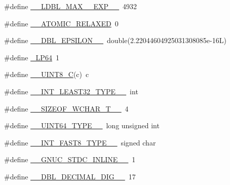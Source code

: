 \begin{DoxyCompactItemize}
\item 
\#define \hyperlink{build-analizer__host-_desktop___qt__5__9__0___g_c_c__64bit-debug_2moc__predefs_8h_afc6ac46966747a9423f4a6bb3af94b55}{\+\_\+\+\_\+\+L\+D\+B\+L\+\_\+\+M\+A\+X\+\_\+\_\+\+E\+X\+P\+\_\+\+\_\+}~4932
\item 
\#define \hyperlink{build-analizer__host-_desktop___qt__5__9__0___g_c_c__64bit-debug_2moc__predefs_8h_a8faf1f097f05558889df4c44d052d35e}{\+\_\+\+\_\+\+A\+T\+O\+M\+I\+C\+\_\+\+R\+E\+L\+A\+X\+E\+D}~0
\item 
\#define \hyperlink{build-analizer__host-_desktop___qt__5__9__0___g_c_c__64bit-debug_2moc__predefs_8h_a54983bc256dc296a42fe88b9be24f268}{\+\_\+\+\_\+\+D\+B\+L\+\_\+\+E\+P\+S\+I\+L\+O\+N\+\_\+\+\_\+}~double(2.\+22044604925031308085e-\/16\+L)
\item 
\#define \hyperlink{build-analizer__host-_desktop___qt__5__9__0___g_c_c__64bit-debug_2moc__predefs_8h_a02ee5c8ce8c3a0262b18d716cdeb2d1d}{\+\_\+\+L\+P64}~1
\item 
\#define \hyperlink{build-analizer__host-_desktop___qt__5__9__0___g_c_c__64bit-debug_2moc__predefs_8h_a23cc29e487b9acd9261adc6c71c1ff0e}{\+\_\+\+\_\+\+U\+I\+N\+T8\+\_\+\+C}(c)~c
\item 
\#define \hyperlink{build-analizer__host-_desktop___qt__5__9__0___g_c_c__64bit-debug_2moc__predefs_8h_a401f5f43b9e96d82152bf7cec0be6dfd}{\+\_\+\+\_\+\+I\+N\+T\+\_\+\+L\+E\+A\+S\+T32\+\_\+\+T\+Y\+P\+E\+\_\+\+\_\+}~int
\item 
\#define \hyperlink{build-analizer__host-_desktop___qt__5__9__0___g_c_c__64bit-debug_2moc__predefs_8h_a5cc6a3e1680136db2b5e60c2fb703d99}{\+\_\+\+\_\+\+S\+I\+Z\+E\+O\+F\+\_\+\+W\+C\+H\+A\+R\+\_\+\+T\+\_\+\+\_\+}~4
\item 
\#define \hyperlink{build-analizer__host-_desktop___qt__5__9__0___g_c_c__64bit-debug_2moc__predefs_8h_aef86f5642c3dce887635c9fc632baf34}{\+\_\+\+\_\+\+U\+I\+N\+T64\+\_\+\+T\+Y\+P\+E\+\_\+\+\_\+}~long unsigned int
\item 
\#define \hyperlink{build-analizer__host-_desktop___qt__5__9__0___g_c_c__64bit-debug_2moc__predefs_8h_a3783fd947621ab5304708e78da5bd6d3}{\+\_\+\+\_\+\+I\+N\+T\+\_\+\+F\+A\+S\+T8\+\_\+\+T\+Y\+P\+E\+\_\+\+\_\+}~signed char
\item 
\#define \hyperlink{build-analizer__host-_desktop___qt__5__9__0___g_c_c__64bit-debug_2moc__predefs_8h_ad22737f11009b4bf60ba233eee7420dd}{\+\_\+\+\_\+\+G\+N\+U\+C\+\_\+\+S\+T\+D\+C\+\_\+\+I\+N\+L\+I\+N\+E\+\_\+\+\_\+}~1
\item 
\#define \hyperlink{build-analizer__host-_desktop___qt__5__9__0___g_c_c__64bit-debug_2moc__predefs_8h_a6b5dca178c4ffe879cd624f9b17b9bd1}{\+\_\+\+\_\+\+D\+B\+L\+\_\+\+D\+E\+C\+I\+M\+A\+L\+\_\+\+D\+I\+G\+\_\+\+\_\+}~17

\end{DoxyCompactItemize}
